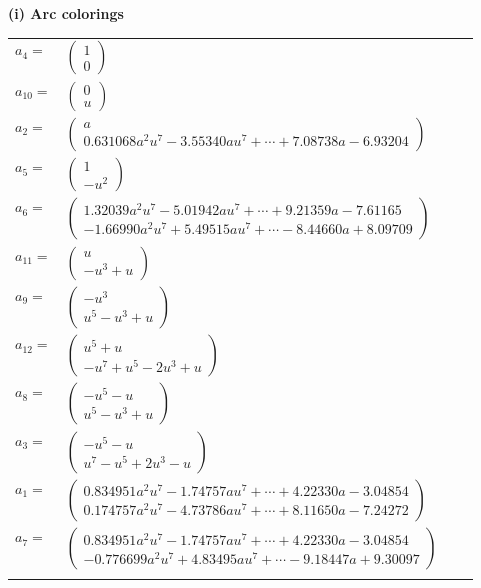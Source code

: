 \documentclass[1p]{elsarticle_modified}
\theoremstyle{definition}
\begin{document}
\flushleft \textbf{(i) Arc colorings}\\
\begin{tabular}{m{7pt} m{180pt} m{7pt} m{180pt} }
\flushright $a_{4}=$&$\begin{pmatrix}1\\0\end{pmatrix}$ \\
\flushright $a_{10}=$&$\begin{pmatrix}0\\u\end{pmatrix}$ \\
\flushright $a_{2}=$&$\begin{pmatrix}a\\0.631068 a^{2} u^{7}-3.55340 a u^{7}+\cdots+7.08738 a-6.93204\end{pmatrix}$ \\
\flushright $a_{5}=$&$\begin{pmatrix}1\\- u^2\end{pmatrix}$ \\
\flushright $a_{6}=$&$\begin{pmatrix}1.32039 a^{2} u^{7}-5.01942 a u^{7}+\cdots+9.21359 a-7.61165\\-1.66990 a^{2} u^{7}+5.49515 a u^{7}+\cdots-8.44660 a+8.09709\end{pmatrix}$ \\
\flushright $a_{11}=$&$\begin{pmatrix}u\\- u^3+u\end{pmatrix}$ \\
\flushright $a_{9}=$&$\begin{pmatrix}- u^3\\u^5- u^3+u\end{pmatrix}$ \\
\flushright $a_{12}=$&$\begin{pmatrix}u^5+u\\- u^7+u^5-2 u^3+u\end{pmatrix}$ \\
\flushright $a_{8}=$&$\begin{pmatrix}- u^5- u\\u^5- u^3+u\end{pmatrix}$ \\
\flushright $a_{3}=$&$\begin{pmatrix}- u^5- u\\u^7- u^5+2 u^3- u\end{pmatrix}$ \\
\flushright $a_{1}=$&$\begin{pmatrix}0.834951 a^{2} u^{7}-1.74757 a u^{7}+\cdots+4.22330 a-3.04854\\0.174757 a^{2} u^{7}-4.73786 a u^{7}+\cdots+8.11650 a-7.24272\end{pmatrix}$ \\
\flushright $a_{7}=$&$\begin{pmatrix}0.834951 a^{2} u^{7}-1.74757 a u^{7}+\cdots+4.22330 a-3.04854\\-0.776699 a^{2} u^{7}+4.83495 a u^{7}+\cdots-9.18447 a+9.30097\end{pmatrix}$\\&\end{tabular}
\end{document}
